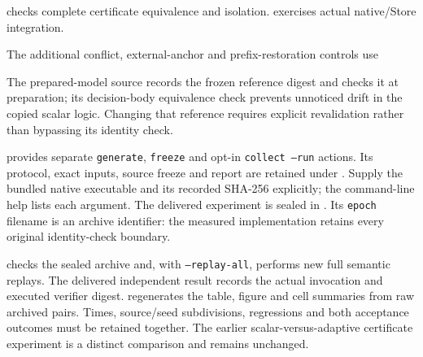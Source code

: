 \documentclass[11pt,a4paper]{article}
\theoremstyle{definition}\newtheorem{definition}[theorem]{Definition}
\begin{document}
 checks complete certificate equivalence and isolation.  exercises actual native/Store integration.

The additional conflict, external-anchor and prefix-restoration controls use
\begin{quote}\raggedright\footnotesize
{}
\end{quote} The prepared-model source records the frozen reference digest and checks it at preparation; its decision-body equivalence check prevents unnoticed drift in the copied scalar logic. Changing that reference requires explicit revalidation rather than bypassing its identity check.

 provides separate \texttt{generate}, \texttt{freeze} and opt-in \texttt{collect --run} actions. Its protocol, exact inputs, source freeze and report are retained under . Supply the bundled native executable and its recorded SHA-256 explicitly; the command-line help lists each argument. The delivered experiment is sealed in . Its \texttt{epoch} filename is an archive identifier: the measured implementation retains every original identity-check boundary.

 checks the sealed archive and, with \texttt{--replay-all}, performs new full semantic replays. The delivered independent result records the actual invocation and executed verifier digest.  regenerates the table, figure and cell summaries from raw archived pairs. Times, source/seed subdivisions, regressions and both acceptance outcomes must be retained together. The earlier scalar-versus-adaptive certificate experiment is a distinct comparison and remains unchanged.
\end{document}
